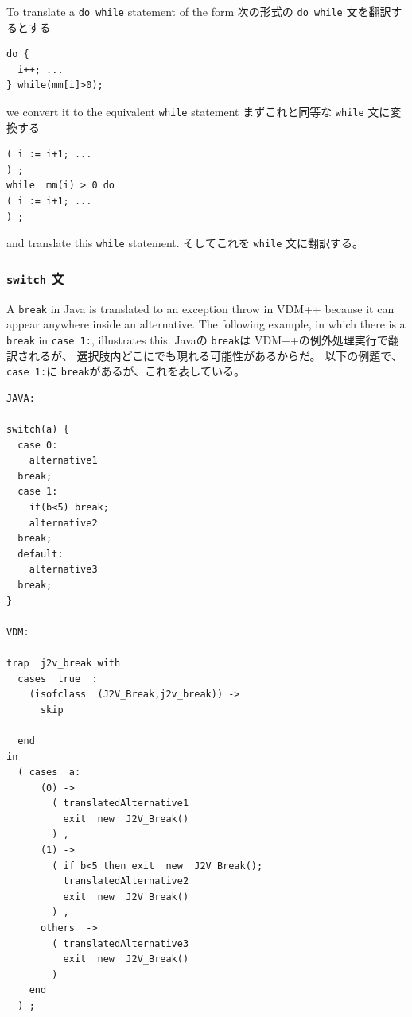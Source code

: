 \documentclass[\pformat,12pt]{jarticle}
\begin{document}
To translate a \texttt{do while} statement of the form 
次の形式の \texttt{do while} 文を翻訳するとする 

\begin{small}
\begin{verbatim}
do {
  i++; ... 
} while(mm[i]>0);
\end{verbatim}
\end{small}

we convert it to the equivalent \texttt{while} statement 
まずこれと同等な \texttt{while} 文に変換する

\begin{small}
\begin{verbatim}
( i := i+1; ...
) ;
while  mm(i) > 0 do  
( i := i+1; ...
) ;
\end{verbatim}
\end{small}

and translate this \texttt{while} statement.
そしてこれを \texttt{while} 文に翻訳する。

\subsubsection{\texttt{switch} 文}

A \texttt{break} in Java is translated to an exception throw in VDM++
because it can appear anywhere inside an alternative. The following
example, in which there is a \texttt{break} in \texttt{case 1:},
illustrates this.
Javaの \texttt{break}は VDM++の例外処理実行で翻訳されるが、 選択肢内どこにでも現れる可能性があるからだ。
以下の例題で、 \texttt{case 1:}に \texttt{break}があるが、これを表している。

\begin{small}
\begin{verbatim}
JAVA:

switch(a) {
  case 0:
    alternative1
  break;
  case 1:
    if(b<5) break;
    alternative2
  break;
  default:
    alternative3
  break;
}

VDM:

trap  j2v_break with  
  cases  true  : 
    (isofclass  (J2V_Break,j2v_break)) -> 
      skip 
    
  end  
in  
  ( cases  a: 
      (0) -> 
        ( translatedAlternative1
          exit  new  J2V_Break()
        ) ,
      (1) -> 
        ( if b<5 then exit  new  J2V_Break();
          translatedAlternative2
          exit  new  J2V_Break()
        ) ,
      others  -> 
        ( translatedAlternative3
          exit  new  J2V_Break()
        ) 
    end  
  ) ;
\end{verbatim}
\end{small}
\end{document}
